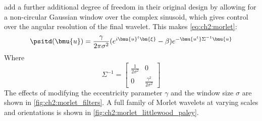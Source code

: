   \citeauthor{bruna_invariant_2013} \cite{bruna_invariant_2013} add a further
  additional degree of freedom in their original design by allowing for a
  non-circular Gaussian window over the complex sinusoid, which gives control
  over the angular resolution of the final wavelet. This makes \eqref{eq:ch2:morlet}:
  \begin{equation}
    \psitd(\bmu{u}) = \frac{\gamma}{2\pi\sigma^2}{(e^{i\bmu{u}^t\bm{\xi}} - \beta)}
                  e^{-\bmu{u^t}\Sigma^{-1}  \bmu{u}}
    \label{eq:ch2:morlet_slant}
  \end{equation}
  Where
  $$\Sigma^{-1} = \left[ \begin{smallmatrix}
      \frac{1}{2\sigma^2} & 0 \\
      0 & \frac{\gamma^2}{2\sigma^2}
      \end{smallmatrix} \right] $$
  The effects of modifying the eccentricity parameter $\gamma$ and the window size
  $\sigma$ are shown in \autoref{fig:ch2:morlet_filters}. A full family of
  Morlet wavelets at varying scales and orientations is shown in
  \autoref{fig:ch2:morlet_littlewood_paley}.

